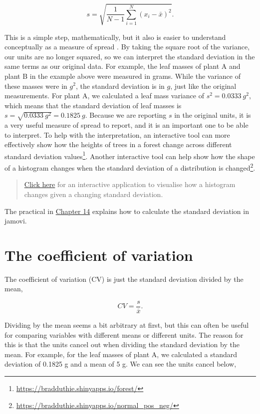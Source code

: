\documentclass[
]{scrbook}
\begin{document}
\[s = \sqrt{\frac{1}{N - 1}\sum_{i = 1}^{N}\left(x_{i} - \bar{x} \right)^{2}}.\]

This is a simple step, mathematically, but it also is easier to understand conceptually as a measure of spread \citep{Navarro2022}.
By taking the square root of the variance, our units are no longer squared, so we can interpret the standard deviation in the same terms as our original data.
For example, the leaf masses of plant A and plant B in the example above were measured in grams.
While the variance of these masses were in \(g^{2}\), the standard deviation is in \(g\), just like the original measurements.
For plant A, we calculated a leaf mass variance of \(s^{2} = 0.0333\:g^{2}\), which means that the standard deviation of leaf masses is \(s = \sqrt{0.0333\:g^{2}} = 0.1825\:g\).
Because we are reporting \(s\) in the original units, it is a very useful measure of spread to report, and it is an important one to be able to interpret.
To help with the interpretation, an interactive tool can more effectively show how the heights of trees in a forest change across different standard deviation values\footnote{\url{https://bradduthie.shinyapps.io/forest/}}.
Another interactive tool can help show how the shape of a histogram changes when the standard deviation of a distribution is changed\footnote{\url{https://bradduthie.shinyapps.io/normal_pos_neg/}}.

\begin{quote}
\href{https://bradduthie.shinyapps.io/normal_pos_neg/}{Click here} for an interactive application to visualise how a histogram changes given a changing standard deviation.
\end{quote}

The practical in \protect\hyperlink{Chapter_14}{Chapter 14} explains how to calculate the standard deviation in jamovi.

\hypertarget{the-coefficient-of-variation}{%
\section{The coefficient of variation}\label{the-coefficient-of-variation}}

The coefficient of variation (CV) is just the standard deviation divided by the mean,

\[CV = \frac{s}{\bar{x}}.\]

Dividing by the mean seems a bit arbitrary at first, but this can often be useful for comparing variables with different means or different units.
The reason for this is that the units cancel out when dividing the standard deviation by the mean.
For example, for the leaf masses of plant A, we calculated a standard deviation of 0.1825 g and a mean of 5 g.
We can see the units cancel below,
\end{document}
